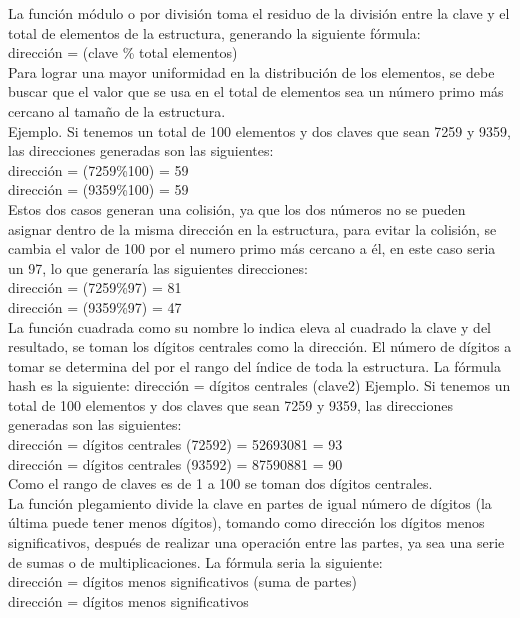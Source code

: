 \documentclass[letterpaper,openright,12pt]{report}
\begin{document}
La función módulo o por división toma el residuo de la división entre la
clave y el total de elementos de la estructura, generando la siguiente
fórmula: \\[0.4cm]dirección = (clave \% total elementos)\\[0.4cm] Para lograr una mayor
uniformidad en la distribución de los elementos, se debe buscar que el
valor que se usa en el total de elementos sea un número primo más
cercano al tamaño de la estructura. \\Ejemplo. Si tenemos un total de 100
elementos y dos claves que sean 7259 y 9359, las direcciones generadas
son las siguientes: \\[0.4cm]dirección = (7259\%100) = 59 \\dirección = (9359\%100)
= 59 \\[0.4cm]Estos dos casos generan una colisión, ya que los dos números no se
pueden asignar dentro de la misma dirección en la estructura, para
evitar la colisión, se cambia el valor de 100 por el numero primo más
cercano a él, en este caso seria un 97, lo que generaría las siguientes
direcciones:\\[0.4cm] dirección = (7259\%97) = 81 \\dirección = (9359\%97) = 47\\[2.0cm]
La función cuadrada como su nombre lo indica eleva al cuadrado la clave
y del resultado, se toman los dígitos centrales como la dirección. El
número de dígitos a tomar se determina del por el rango del índice de
toda la estructura. La fórmula hash es la siguiente: dirección = dígitos
centrales (clave2) Ejemplo. Si tenemos un total de 100 elementos y dos
claves que sean 7259 y 9359, las direcciones generadas son las
siguientes:\\[0.4cm] dirección = dígitos centrales (72592) = 52693081 = 93\\
dirección = dígitos centrales (93592) = 87590881 = 90\\ Como el rango de
claves es de 1 a 100 se toman dos dígitos centrales.\\[0.4cm]
La función plegamiento divide la clave en partes de igual número de
dígitos (la última puede tener menos dígitos), tomando como dirección
los dígitos menos significativos, después de realizar una operación
entre las partes, ya sea una serie de sumas o de multiplicaciones. La
fórmula seria la siguiente:\\[0.4cm] dirección = dígitos menos significativos
(suma de partes)\\ dirección = dígitos menos significativos
\end{document}
